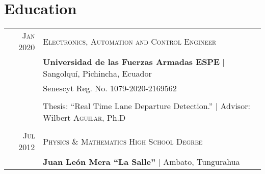\documentclass[a4paper,10.9pt]{article}
\begin{document}
\section{Education}
\begin{tabular}{r|l}	
 \textsc{Jan} 2020& \textsc{Electronics, Automation and Control Engineer}\\&
 \textbf{Universidad de las Fuerzas Armadas ESPE} | Sangolquí, Pichincha, Ecuador\\
&Senescyt Reg. No. 1079-2020-2169562\\
\\
& Thesis: ``Real Time Lane Departure Detection.'' | \small Advisor: Wilbert \textsc{Aguilar}, Ph.D\\
\multicolumn{2}{c}{} \\
 \textsc{Jul} 2012 &  \textsc{Physics \& Mathematics High School Degree}\\&
 \textbf{Juan León Mera “La Salle”} | Ambato, Tungurahua\\
\end{tabular}

\end{document}
